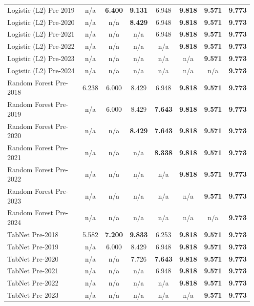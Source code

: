 \begin{table}[htbp]
{\begin{tabular}{lccccccc}
Logistic (L2) Pre-2019 & n/a & \textbf{6.400} & \textbf{9.131} & 6.948 & \textbf{9.818} & \textbf{9.571} & \textbf{9.773} \\
Logistic (L2) Pre-2020 & n/a & n/a & \textbf{8.429} & 6.948 & \textbf{9.818} & \textbf{9.571} & \textbf{9.773} \\
Logistic (L2) Pre-2021 & n/a & n/a & n/a & 6.948 & \textbf{9.818} & \textbf{9.571} & \textbf{9.773} \\
Logistic (L2) Pre-2022 & n/a & n/a & n/a & n/a & \textbf{9.818} & \textbf{9.571} & \textbf{9.773} \\
Logistic (L2) Pre-2023 & n/a & n/a & n/a & n/a & n/a & \textbf{9.571} & \textbf{9.773} \\
Logistic (L2) Pre-2024 & n/a & n/a & n/a & n/a & n/a & n/a & \textbf{9.773} \\
Random Forest Pre-2018 & 6.238 & 6.000 & 8.429 & 6.948 & \textbf{9.818} & \textbf{9.571} & \textbf{9.773} \\
Random Forest Pre-2019 & n/a & 6.000 & 8.429 & \textbf{7.643} & \textbf{9.818} & \textbf{9.571} & \textbf{9.773} \\
Random Forest Pre-2020 & n/a & n/a & \textbf{8.429} & \textbf{7.643} & \textbf{9.818} & \textbf{9.571} & \textbf{9.773} \\
Random Forest Pre-2021 & n/a & n/a & n/a & \textbf{8.338} & \textbf{9.818} & \textbf{9.571} & \textbf{9.773} \\
Random Forest Pre-2022 & n/a & n/a & n/a & n/a & \textbf{9.818} & \textbf{9.571} & \textbf{9.773} \\
Random Forest Pre-2023 & n/a & n/a & n/a & n/a & n/a & \textbf{9.571} & \textbf{9.773} \\
Random Forest Pre-2024 & n/a & n/a & n/a & n/a & n/a & n/a & \textbf{9.773} \\
TabNet Pre-2018 & 5.582 & \textbf{7.200} & \textbf{9.833} & 6.253 & \textbf{9.818} & \textbf{9.571} & \textbf{9.773} \\
TabNet Pre-2019 & n/a & 6.000 & 8.429 & 6.948 & \textbf{9.818} & \textbf{9.571} & \textbf{9.773} \\
TabNet Pre-2020 & n/a & n/a & 7.726 & \textbf{7.643} & \textbf{9.818} & \textbf{9.571} & \textbf{9.773} \\
TabNet Pre-2021 & n/a & n/a & n/a & 6.948 & \textbf{9.818} & \textbf{9.571} & \textbf{9.773} \\
TabNet Pre-2022 & n/a & n/a & n/a & n/a & \textbf{9.818} & \textbf{9.571} & \textbf{9.773} \\
TabNet Pre-2023 & n/a & n/a & n/a & n/a & n/a & \textbf{9.571} & \textbf{9.773} \\

\end{tabular}}
\end{table}
